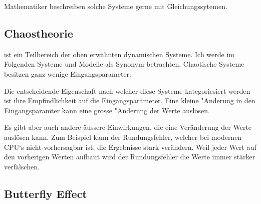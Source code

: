 Mathematiker beschreiben solche Systeme gerne mit Gleichungssytemen.

\subsection{Chaostheorie} ist ein Teilbereich der oben erwähnten dynamischen Systeme. Ich werde im Folgenden Systeme und Modelle als Synonym betrachten. Chaotische Systeme besitzen ganz wenige Eingangsparameter.

Die entscheidende Eigenschaft nach welcher diese Systeme kategoriesiert werden ist ihre Empfindlichkeit auf die Eingangsparameter. Eine kleine "Anderung in den Eingangsparamter kann eine grosse "Anderung der Werte auslösen.

Es gibt aber auch andere äussere Einwirkungen, die eine Veränderung der Werte auslösen kann. Zum Beispiel kann der Rundungsfehler, welcher bei modernen CPU‘s nicht-vorhersagbar ist, die Ergebnisse stark verändern. Weil jeder Wert auf den vorherigen Werten aufbaut wird der Rundungsfehler die Werte immer stärker verfälschen.

\subsection{Butterfly Effect}

